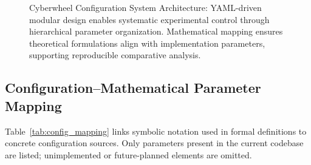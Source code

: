 \documentclass[12pt,oneside]{article}
\begin{document}
\begin{figure}[H]
\label{fig:config_architecture}

\caption{Cyberwheel Configuration System Architecture: YAML-driven modular design enables systematic experimental control through hierarchical parameter organization. Mathematical mapping ensures theoretical formulations align with implementation parameters, supporting reproducible comparative analysis.}
\end{figure}

\subsection{Configuration--Mathematical Parameter Mapping}

Table~\ref{tab:config_mapping} links symbolic notation used in formal definitions to concrete configuration sources. Only parameters present in the current codebase are listed; unimplemented or future-planned elements are omitted.
\end{document}
